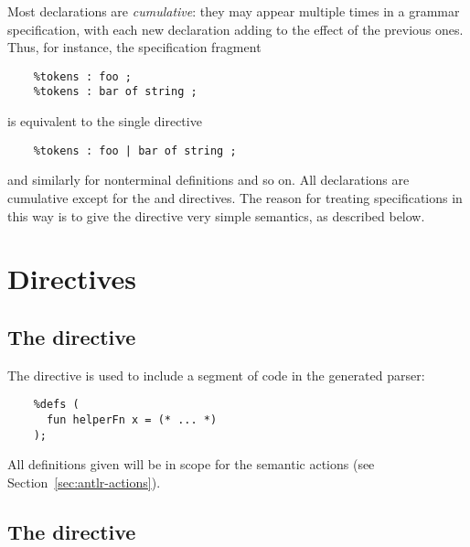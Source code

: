 Most \antlr{} declarations are \emph{cumulative}: they may appear multiple times in a grammar specification, with each new declaration adding to the effect of the previous ones.  Thus, for instance, the specification fragment
\begin{verbatim}
    %tokens : foo ;
    %tokens : bar of string ;
\end{verbatim}
is equivalent to the single directive
\begin{verbatim}
    %tokens : foo | bar of string ;
\end{verbatim}
and similarly for nonterminal definitions and so on.  All declarations are cumulative except for the  and  directives.
The reason for treating specifications in this way is to give the  directive very simple semantics, as described below.

\section{Directives}

\subsection{The  directive}

The  directive is used to include a segment of code in the generated parser:  
\begin{verbatim}
    %defs (
      fun helperFn x = (* ... *)
    );
\end{verbatim}
All definitions given will be in scope for the semantic actions (see Section~\ref{sec:antlr-actions}).

\subsection{The  directive}

